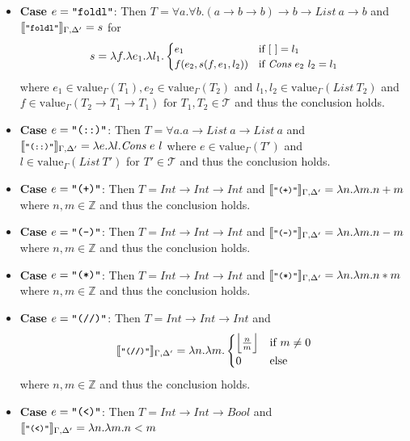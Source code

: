 \documentclass[]{scrbook}
\newcommand{\mf}[1]{\text{\texttt{#1}}}
\newcommand{\semantic}[1]{\llbracket \text{\footnotesize\texttt{#1}} \rrbracket}
\theoremstyle{definition}
\theoremstyle{definition}
\theoremstyle{definition}
\theoremstyle{remark}
\begin{document}
\begin{itemize}
\item\textbf{Case} $e = \mf{"foldl"}$: Then $T = \forall a.\forall b.(a\to b \to b)\to b \to \mathit{List} \ a \to b$ and \(\semantic{"foldl"}_{\Gamma,\Delta'}=s\) for \[s = \lambda f. \lambda e_1. \lambda l_1.
    \small\begin{cases}
        e_1 &\text{if } [\ ] = l_1\\
        f(e_2, s(f,e_1,l_2)) & \text{if } \textit{Cons} \ e_2 \ l_2 = l_1
      \end{cases}\]
where $e_1\in\text{value}_\Gamma(T_1),e_2\in\text{value}_\Gamma(T_2)$ and  $l_1,l_2\in\text{value}_\Gamma(\mathit{List}\ T_2)$ and $f\in\text{value}_\Gamma(T_2\to T_1 \to T_1) \text{ for } T_1,T_2\in\mathcal{T}$ and thus the conclusion holds.
\item\textbf{Case} $e = \mf{"(::)"}$: Then $T = \forall a.a\to \mathit{List} \ a \to \mathit{List} \ a$ and \(\semantic{"(::)"}_{\Gamma,\Delta'} = \lambda e. \lambda l. \textit{Cons} \ e \ l\) where $e\in\text{value}_\Gamma(T')$ and $l\in\text{value}_\Gamma(\mathit{List} \ T')$ for $T'\in\mathcal{T}$ and thus the conclusion holds.
\item\textbf{Case} $e = \mf{"(+)"}$: Then $T =\textit{Int}\to\textit{Int}\to\textit{Int}$ and $\semantic{"(+)"}_{\Gamma,\Delta'} = \lambda n.\lambda m. n + m$ where $n,m\in\mathbb{Z}$ and thus the conclusion holds.
\item\textbf{Case} $e = \mf{"(-)"}$: Then $T =\textit{Int}\to\textit{Int}\to\textit{Int}$ and \(\semantic{"(-)"}_{\Gamma,\Delta'} = \lambda n.\lambda m. n - m\) where $n,m\in\mathbb{Z}$ and thus the conclusion holds.
\item\textbf{Case} $e = \mf{"(*)"}$: Then $T = \textit{Int}\to\textit{Int}\to\textit{Int}$ and \(\semantic{"(*)"}_{\Gamma,\Delta'} = \lambda n.\lambda m. n * m\) where $n,m\in\mathbb{Z}$
and thus the conclusion holds.
\item\textbf{Case} $e = \mf{"(//)"}$: Then $T = \textit{Int}\to\textit{Int}\to\textit{Int}$ and \[\semantic{"(//)"}_{\Gamma,\Delta'} = \lambda n.\lambda m. \begin{cases}\Big\lfloor \frac{n}{m} \Big\rfloor& \text{if } m \neq 0\\
        0& \text{else}\end{cases}\]
where $n,m\in\mathbb{Z}$ and thus the conclusion holds.
\item\textbf{Case} $e = \mf{"(<)"}$: Then $T = \textit{Int}\to\textit{Int}\to\textit{Bool}$ and \(\semantic{"(<)"}_{\Gamma,\Delta'} = \lambda n.\lambda m. n < m\)

\end{itemize}
\end{document}
